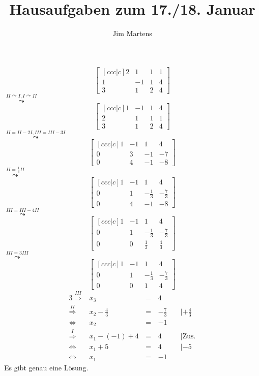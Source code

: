 \documentclass[10pt,a4paper,oneside,ngerman,numbers=noenddot]{scrartcl}
\begin{document}
\author{Jim Martens}
\title{Hausaufgaben zum 17./18. Januar}
\maketitle
\section{} %
\subsection{} %
\[
\begin{bmatrix}[ccc|c]
2 & 1 & 1 & 1 \\
1 & -1 & 1 & 4 \\
3 & 1 & 2 & 4
\end{bmatrix}
\]
$\overset{II \curvearrowright I, I \curvearrowright II}{\leadsto}$
\[
\begin{bmatrix}[ccc|c]
1 & -1 & 1 & 4 \\
2 & 1 & 1 & 1 \\
3 & 1 & 2 & 4
\end{bmatrix}
\]
$\overset{II = II - 2I, III = III - 3I}{\leadsto}$
\[
\begin{bmatrix}[ccc|c]
1 & -1 & 1 & 4 \\
0 & 3 & -1 & -7 \\
0 & 4 & -1 & -8
\end{bmatrix}
\]
$\overset{II = \frac{1}{3}II}{\leadsto}$
\[
\begin{bmatrix}[ccc|c]
1 & -1 & 1 & 4 \\
0 & 1 & -\frac{1}{3} & -\frac{7}{3} \\
0 & 4 & -1 & -8
\end{bmatrix}
\]
$\overset{III = III - 4II}{\leadsto}$
\[
\begin{bmatrix}[ccc|c]
1 & -1 & 1 & 4 \\
0 & 1 & -\frac{1}{3} & -\frac{7}{3} \\
0 & 0 & \frac{1}{3} & \frac{4}{3}
\end{bmatrix}
\]
$\overset{III = 3III}{\leadsto}$
\[
\begin{bmatrix}[ccc|c]
1 & -1 & 1 & 4 \\
0 & 1 & -\frac{1}{3} & -\frac{7}{3} \\
0 & 0 & 1 & 4
\end{bmatrix}
\]
\begin{alignat*}{3}
\overset{III}{\Rightarrow} & x_{3} &\,=\,& 4 && \\
\overset{II}{\Rightarrow} & x_{2} - \frac{4}{3} &\,=\,& - \frac{7}{3} && \;| +\frac{4}{3} \\
\Leftrightarrow & x_{2} &\,=\,& -1 & \\
\overset{I}{\Rightarrow} & x_{1} - (-1) + 4 &\,=\,& 4 && \;|\text{Zus.} \\
\Leftrightarrow & x_{1} + 5 &\,=\,& 4 && \;| -5 \\
\Leftrightarrow & x_{1} &\,=\,& -1 &&
\end{alignat*}
Es gibt genau eine Lösung.
\end{document}
